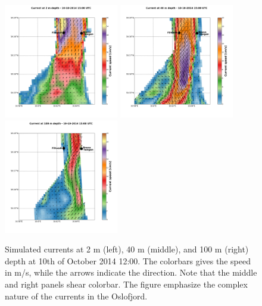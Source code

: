 \begin{figure}[ht]
	\centerline{
		\includegraphics*[trim=2cm 3cm 1cm 3.3cm,clip=true,height=5cm]{Figurer/Filtvedt_t4611_z2_current}
		\includegraphics*[trim=3.8cm 3cm 6cm 3.3cm,clip=true,height=5cm]{Figurer/Filtvedt_t4611_z40_current}
		\includegraphics*[trim=3.8cm 3cm 1cm 3.3cm,clip=true,height=5cm]{Figurer/Filtvedt_t4611_z100_current}}
	\caption{\small Simulated currents at 2 m (left), 40 m (middle), and 100 m (right) depth at 10th of October 2014 12:00. The colorbars gives the speed in m/s, while the arrows indicate the direction. Note that the middle and right panels shear colorbar. The figure emphasize the complex nature of the currents in the Oslofjord.}
	\label{fig:Filtvedt-simcur}
\end{figure}

